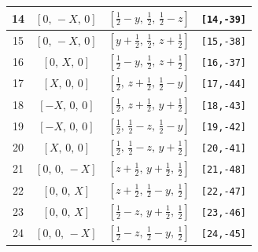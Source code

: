 \documentclass[fleqn,8pt]{jsarticle}
\begin{document}
\begin{longtable}{cccc}
14 & $\left[ 0,\, - X,\, 0 \right]$ & $\left[ \frac{1}{2} - y,\, \frac{1}{2},\, \frac{1}{2} - z \right]$ & {\tt [14,-39]} \\ \hline
15 & $\left[ 0,\, - X,\, 0 \right]$ & $\left[ y + \frac{1}{2},\, \frac{1}{2},\, z + \frac{1}{2} \right]$ & {\tt [15,-38]} \\ \hline
16 & $\left[ 0,\, X,\, 0 \right]$ & $\left[ \frac{1}{2} - y,\, \frac{1}{2},\, z + \frac{1}{2} \right]$ & {\tt [16,-37]} \\ \hline
17 & $\left[ X,\, 0,\, 0 \right]$ & $\left[ \frac{1}{2},\, z + \frac{1}{2},\, \frac{1}{2} - y \right]$ & {\tt [17,-44]} \\ \hline
18 & $\left[ - X,\, 0,\, 0 \right]$ & $\left[ \frac{1}{2},\, z + \frac{1}{2},\, y + \frac{1}{2} \right]$ & {\tt [18,-43]} \\ \hline
19 & $\left[ - X,\, 0,\, 0 \right]$ & $\left[ \frac{1}{2},\, \frac{1}{2} - z,\, \frac{1}{2} - y \right]$ & {\tt [19,-42]} \\ \hline
20 & $\left[ X,\, 0,\, 0 \right]$ & $\left[ \frac{1}{2},\, \frac{1}{2} - z,\, y + \frac{1}{2} \right]$ & {\tt [20,-41]} \\ \hline
21 & $\left[ 0,\, 0,\, - X \right]$ & $\left[ z + \frac{1}{2},\, y + \frac{1}{2},\, \frac{1}{2} \right]$ & {\tt [21,-48]} \\ \hline
22 & $\left[ 0,\, 0,\, X \right]$ & $\left[ z + \frac{1}{2},\, \frac{1}{2} - y,\, \frac{1}{2} \right]$ & {\tt [22,-47]} \\ \hline
23 & $\left[ 0,\, 0,\, X \right]$ & $\left[ \frac{1}{2} - z,\, y + \frac{1}{2},\, \frac{1}{2} \right]$ & {\tt [23,-46]} \\ \hline
24 & $\left[ 0,\, 0,\, - X \right]$ & $\left[ \frac{1}{2} - z,\, \frac{1}{2} - y,\, \frac{1}{2} \right]$ & {\tt [24,-45]} \\
\end{longtable}
\renewcommand{\arraystretch}{1.2}
\end{document}
